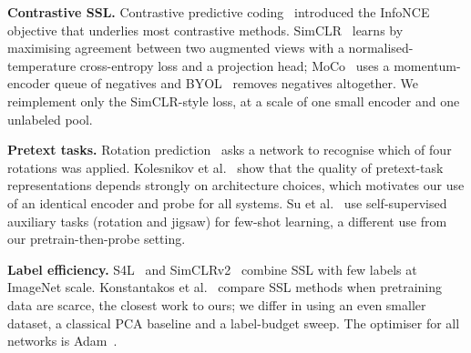 \textbf{Contrastive SSL.} Contrastive predictive coding~\cite{oord2018representation} introduced the InfoNCE objective that underlies most contrastive methods. SimCLR~\cite{chen2020simple} learns by maximising agreement between two augmented views with a normalised-temperature cross-entropy loss and a projection head; MoCo~\cite{he2019momentum} uses a momentum-encoder queue of negatives and BYOL~\cite{grill2020bootstrap} removes negatives altogether. We reimplement only the SimCLR-style loss, at a scale of one small encoder and one unlabeled pool.

\textbf{Pretext tasks.} Rotation prediction~\cite{gidaris2018unsupervised} asks a network to recognise which of four rotations was applied. Kolesnikov et al.~\cite{kolesnikov2019revisiting} show that the quality of pretext-task representations depends strongly on architecture choices, which motivates our use of an identical encoder and probe for all systems. Su et al.~\cite{su2019boosting} use self-supervised auxiliary tasks (rotation and jigsaw) for few-shot learning, a different use from our pretrain-then-probe setting.

\textbf{Label efficiency.} S4L~\cite{zhai2019s} and SimCLRv2~\cite{chen2020big} combine SSL with few labels at ImageNet scale. Konstantakos et al.~\cite{konstantakos2024self} compare SSL methods when pretraining data are scarce, the closest work to ours; we differ in using an even smaller dataset, a classical PCA baseline and a label-budget sweep. The optimiser for all networks is Adam~\cite{kingma2014adam}.
